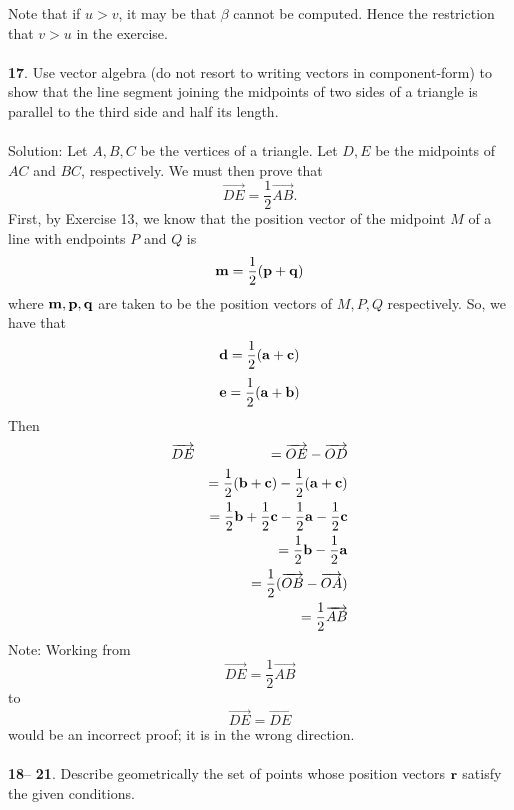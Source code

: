 \documentclass[12pt]{amsbook}
\begin{document}
Note that if $u>v$, it may be that $\beta$ cannot be computed. Hence the restriction that $v>u$ in the exercise. 
\\
\\
{\small\bf 17}. Use vector algebra (do not resort to writing
vectors in component-form) to show that the line segment
joining the midpoints of two sides of a triangle is parallel
to the third side and half its length.
\\ 
\\
{\sc Solution}:
Let $A,B,C$ be the vertices of a triangle. Let $D,E$ be the midpoints of $AC$ and $BC$, respectively. We must then prove that $$\overrightarrow{DE}=\frac 12\overrightarrow{AB}.$$
First, by Exercise 13, we know that the position vector of the midpoint $M$ of a line with endpoints $P$ and $Q$ is
$${\bf m}=\frac 12(\bf p+q)$$
where $\bf m,p,q$ are taken to be the position vectors of $M,P,Q$ respectively. So, we have that
$${\bf d}=\frac 12(\bf a+c)$$
$${\bf e}=\frac 12(\bf a+b)$$
Then
\begin{eqnarray*}
&\overrightarrow{DE}&=\overrightarrow{OE}-\overrightarrow{OD}\\
&&=\frac 12({\bf b}+{\bf c})-\frac 12({\bf a + c}) \\
&&=\frac 12{\bf b}+\frac 12{\bf c}-\frac 12{\bf a} -\frac 12 {\bf c} \\
&&=\frac 12{\bf b}-\frac 12{\bf a} \\
&&=\frac 12(\overrightarrow{OB}-\overrightarrow{OA}) \\
&&=\frac 12\overrightarrow{AB}
\end{eqnarray*}
Note: Working from $$\overrightarrow{DE}=\frac 12\overrightarrow{AB}$$
to $$\overrightarrow{DE}=\overrightarrow{DE}$$
would be an incorrect proof; it is in the wrong direction.
\\
\\
{\small\bf 18}-- {\small\bf 21}. Describe geometrically the set 
of points whose position vectors ${\bf r}$ satisfy the 
given conditions.
\end{document}
